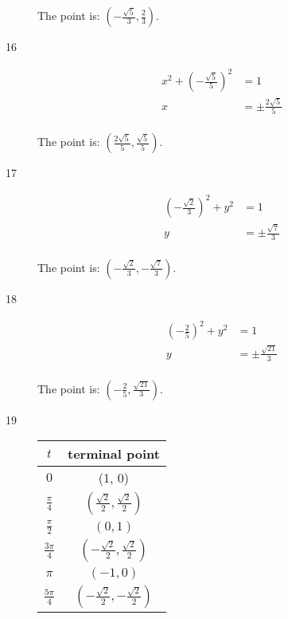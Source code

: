 \documentclass{exam}
\begin{document}
\begin{description}
        The point is: $\boxed{ \left( - \frac{\sqrt{5}}{3}, \frac{2}{3} \right) }$.

      \item[16]
        \begin{align*}
          x^2 + \left( - \frac{\sqrt{5}}{5} \right)^2 & = 1 \\
          x                                  & = \pm \frac{2 \sqrt{5}}{5} \\
        \end{align*}

        The point is: $\boxed{ \left( \frac{2 \sqrt{5}}{5}, \frac{\sqrt{5}}{5} \right) }$.

      \item[17]
        \begin{align*}
          \left( - \frac{\sqrt{2}}{3} \right)^2 + y^2 & = 1 \\
          y                                           & = \pm \frac{\sqrt{7}}{3} \\
        \end{align*}

        The point is: $\boxed{ \left( - \frac{\sqrt{2}}{3}, - \frac{\sqrt{7}}{3} \right) }$.

      \item[18]
        \begin{align*}
          \left( - \frac{2}{5} \right)^2 + y^2 & = 1 \\
          y                                    & = \pm \frac{\sqrt{21}}{3} \\
        \end{align*}

        The point is: $\boxed{ \left( - \frac{2}{5}, \frac{\sqrt{21}}{3} \right) }$.

      \item[19]
        \begin{tabular}{cc}
          \toprule
          $t$ & terminal point \\
          \midrule
          $0$ & (1, 0) \\
          $\frac{\pi}{4}$ & $\left( \frac{\sqrt{2}}{2}, \frac{\sqrt{2}}{2} \right)$ \\

          $\frac{\pi}{2}$ & $\left( 0, 1 \right)$ \\
          $\frac{3 \pi}{4}$ & $\left( -\frac{\sqrt{2}}{2}, \frac{\sqrt{2}}{2} \right)$ \\

          $\pi$ & $\left( -1, 0 \right)$ \\
          $\frac{5 \pi}{4}$ & $\left( -\frac{\sqrt{2}}{2}, -\frac{\sqrt{2}}{2} \right)$ \\


\end{tabular}
\end{description}
\end{document}
